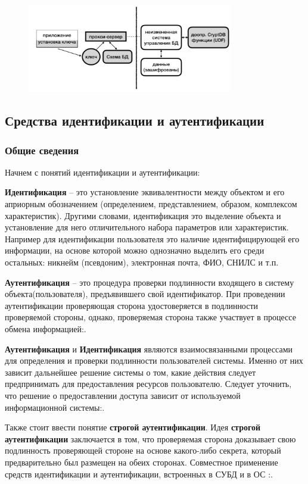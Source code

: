 \begin{figure}[h]
    \centering
    \includegraphics[width=0.8\textwidth]{assets/CryptDB.png}
\end{figure}


\subsection{Средства идентификации и аутентификации}
\subsubsection{Общие сведения}
Начнем с понятий идентификации и аутентификации:

\textbf{Идентификация} – это установление эквивалентности между объектом и его априорным
обозначением (определением, представлением, образом, комплексом характеристик). Другими словами,
идентификация это выделение объекта и установление для него отличительного набора параметров или
характеристик. Например для идентификации пользователя это наличие идентифицирующей его
информации, на основе которой можно однозначно выделить его среди остальных: никнейм (псевдоним),
электронная почта, ФИО, СНИЛС и т.п.\cite{crypto-methods}

\textbf{Аутентификация} – это процедура проверки подлинности входящего в систему объекта(пользователя),
предъявившего свой идентификатор. При проведении аутентификации проверяющая сторона удостоверяется в подлинности
проверяемой стороны, однако, проверяемая сторона также участвует в процессе обмена информацией\cite{crypto-methods}:.

\textbf{Аутентификация} и \textbf{Идентификация} являются взаимосвязанными процессами для определения и проверки
подлинности пользователей системы. Именно от них зависит дальнейшее решение системы о том, какие
действия следует предпринимать для предоставления ресурсов пользователю. Следует уточнить, что
решение о предоставлении доступа зависит от используемой информационной системы\cite{crypto-methods}:.

Также стоит ввести понятие \textbf{строгой аутентификации}. Идея \textbf{строгой аутентификации}
заключается в том, что проверяемая сторона доказывает свою подлинность проверяющей стороне на
основе какого-либо секрета, который предварительно был размещен на обеих сторонах. Совместное
применение средств идентификации и аутентификации, встроенных в СУБД и в ОС \cite{crypto-methods}:.

